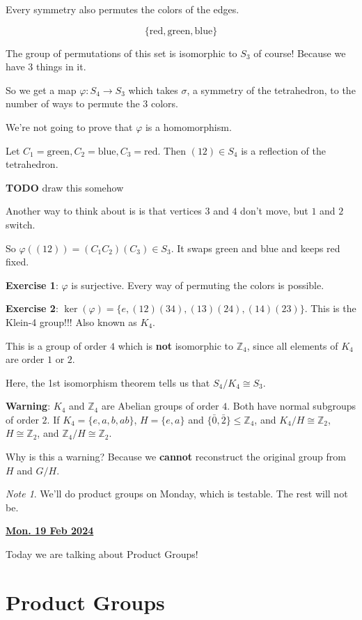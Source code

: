 \documentclass[12pt]{article}
\renewcommand{\date}[1]{\underline{\bf #1}}
\def\Z{{\mathbb Z}}
\def\TODO{\color{red}\textbf{TODO}\color{black}}
\theoremstyle{remark}
\theoremstyle{remark}
\theoremstyle{remark}
\theoremstyle{remark}
\theoremstyle{remark}
\newtheorem*{note}{Note}
\begin{document}
Every symmetry also permutes the colors of the edges.

\[
  \{\text{red}, \text{green}, \text{blue}\}
\]

The group of permutations of this set is isomorphic to $S_3$ of course! Because
we have 3 things in it.

So we get a map $\varphi: S_4 \to S_3$ which takes $\sigma$, a symmetry of the
tetrahedron, to the number of ways to permute the $3$ colors.

We're not going to prove that $\varphi$ is a homomorphism.

Let $C_1 = \text{green}, C_2 = \text{blue}, C_3 = \text{red}$. Then $(12) \in
S_4$ is a reflection of the tetrahedron.

\TODO{} draw this somehow

Another way to think about is is that vertices $3$ and $4$ don't move, but $1$
and $2$ switch.

So $\varphi((12)) = (C_1 C_2)(C_3) \in S_3$. It swaps green and blue and keeps
red fixed.

{\bf Exercise 1}: $\varphi$ is surjective. Every way of permuting the colors is
possible.

{\bf Exercise 2}: $\ker(\varphi) = \{e, (12)(34), (13)(24), (14)(23) \}$. This
is the Klein-4 group!!! Also known as $K_4$.

This is a group of order $4$ which is {\bf not} isomorphic to $\Z_4$, since all
elements of $K_4$ are order $1$ or $2$.

Here, the 1st isomorphism theorem tells us that $S_4 / K_4 \cong S_3$.

{\bf Warning}: $K_4$ and $\Z_4$ are Abelian groups of order $4$. Both have
normal subgroups of order $2$. If $K_4 = \{e, a, b, ab\}$, $H = \{e, a\}$ and
$\{\bar 0, \bar 2\} \le \Z_4$, and $K_4 / H \cong \Z_2$, $H \cong \Z_2$, and
$\Z_4 / H \cong \Z_2$.

Why is this a warning? Because we {\bf cannot} reconstruct the original group
from $H$ and $G / H$.

\begin{note}
  We'll do product groups on Monday, which is testable. The rest will not be.
\end{note}

\date{Mon. 19 Feb 2024}

Today we are talking about Product Groups!

\section{Product Groups}
\end{document}
